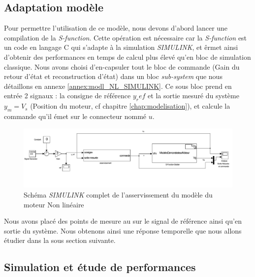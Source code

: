 		\subsection{Adaptation modèle}
		Pour permettre l'utilisation de ce modèle, nous devons d'abord lancer une compilation de la \emph{S-function}. Cette opération est nécessaire car la \emph{S-function} est un code en langage C qui s'adapte à la simulation \emph{SIMULINK}, et êrmet ainsi d'obtenir des performances en temps de calcul plus élevé qu'en bloc de simulation classique.
		Nous avons choisi d'en-capsuler tout le bloc de commande (Gain du retour d'état et reconstruction d'état) dans un bloc \emph{sub-system} que nous détaillons en annexe \ref{annex:modl_NL_SIMULINK}. Ce sous bloc prend en entrée 2 signaux : la consigne de référence $y_ref$ et la sortie mesuré du système $y_m = V_s$ (Position du moteur, cf chapitre \ref{chap:modelisation}), et calcule la commande qu'il émet sur le connecteur nommé $u$.
		\begin{figure}[ht]
		\centering
		\includegraphics[width = \textwidth]{./IV/images/NL_RE_BlocEntier.pdf}
		\caption{Schéma \emph{SIMULINK} complet de l'asservissement du modèle du moteur Non linéaire}\label{fig:SIMULINK_NL_schema}
		\end{figure}
		
		Nous avons placé des points de mesure au sur le signal de référence ainsi qu'en sortie du système. Nous obtenons ainsi une réponse temporelle que nous allons étudier dans la sous section suivante.
		\subsection{Simulation et étude de performances}	
